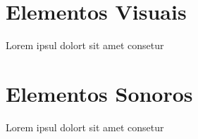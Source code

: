 
\section{Elementos Visuais}

Lorem ipsul dolort sit amet consetur

\section{Elementos Sonoros}

Lorem ipsul dolort sit amet consetur